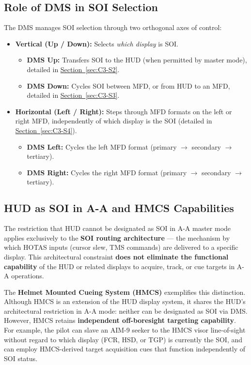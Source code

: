 \documentclass[11pt, a4paper, twoside]{report}
\newcommand{\secref}[1]{\hyperref[#1]{Section~\ref*{#1}}}
\begin{document}
\subsection{Role of DMS in SOI Selection}
\label{sec:C3-S1-S2}

The DMS manages SOI selection through two orthogonal axes of control:

\begin{itemize}
	\item \textbf{Vertical (Up / Down):} Selects \textit{which display} is SOI.
	\begin{itemize}
		\item \textbf{DMS Up:} Transfers SOI to the HUD (when permitted by master mode), detailed in \secref{sec:C3-S2}.
		\item \textbf{DMS Down:} Cycles SOI between MFD, or from HUD to an MFD, detailed in \secref{sec:C3-S3}.
	\end{itemize}
	\item \textbf{Horizontal (Left / Right):} Steps through MFD formats on the left or right MFD, independently of which display is the SOI (detailed in \secref{sec:C3-S4}).
	\begin{itemize}
		\item \textbf{DMS Left:} Cycles the left MFD format (primary $\to$ secondary $\to$ tertiary).
		\item \textbf{DMS Right:} Cycles the right MFD format (primary $\to$ secondary $\to$ tertiary).
	\end{itemize}
\end{itemize}

\subsection{HUD as SOI in A-A and HMCS Capabilities}
\label{sec:C3-S1-S3}

The restriction that HUD cannot be designated as SOI in A-A master mode applies exclusively to the \textbf{SOI routing architecture} — the mechanism by which HOTAS inputs (cursor slew, TMS commands) are delivered to a specific display. This architectural constraint \textbf{does not eliminate the functional capability} of the HUD or related displays to acquire, track, or cue targets in A-A operations.

The \textbf{Helmet Mounted Cueing System (HMCS)} exemplifies this distinction. Although HMCS is an extension of the HUD display system, it shares the HUD's 
architectural restriction in A-A mode: neither can be designated as SOI via DMS. However, HMCS retains \textbf{independent off-boresight targeting capability}. For example, the pilot can slave an AIM-9 seeker to the HMCS visor line-of-sight without regard to which display (FCR, HSD, or TGP) is currently the SOI, and can employ HMCS-derived target acquisition cues that function independently of SOI status.
\end{document}
